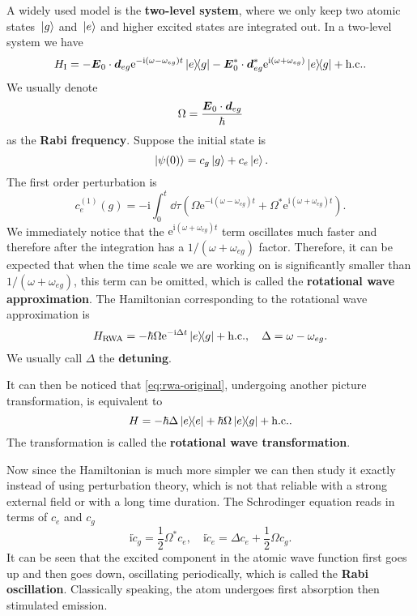 \documentclass[hyperref, a4paper]{article}
\newcommand*{\ii}{\mathrm{i}}
\newcommand*{\ee}{\mathrm{e}}
\newcommand*{\concept}[1]{{\textbf{#1}}}
\begin{document}
A widely used model is the \concept{two-level system}, where we only keep two atomic states $\ket*{g}$ and $\ket*{e}$ and higher excited states are integrated out.
In a two-level system we have 
\begin{equation}
    H_\text{I} = - \vb*{E}_0 \cdot \vb*{d}_{eg} \ee^{- \ii (\omega - \omega_{eg}) t} \dyad{e}{g} - \vb*{E}_0^* \cdot \vb*{d}^*_{{eg}} \ee^{\ii (\omega + \omega_{eg})} \dyad{e}{g} + \text{h.c.}.
\end{equation}
We usually denote 
\begin{equation}
    \Omega = \frac{\vb*{E}_0 \cdot \vb*{d}_{eg}}{\hbar}
\end{equation}
as the \concept{Rabi frequency}.
Suppose the initial state is 
\begin{equation}
    \ket*{\psi(0)} = c_{g} \ket*{g} + c_{e} \ket*{e}.
\end{equation}
The first order perturbation is 
\begin{equation}
    c^{(1)}_e(g) = - \ii \int_0^t \dd{\tau} (\Omega \ee^{- \ii (\omega - \omega_{eg}) t} + \Omega^* \ee^{\ii (\omega + \omega_{eg}) t}).
\end{equation}
We immediately notice that the $\ee^{\ii (\omega + \omega_{eg}) t}$ term oscillates much faster and therefore after the integration has a $1 / (\omega + \omega_{eg})$ factor.
Therefore, it can be expected that when the time scale we are working on is significantly smaller than $1 / (\omega + \omega_{eg})$, this term can be omitted, which is called the \concept{rotational wave approximation}.
The Hamiltonian corresponding to the rotational wave approximation is 
\begin{equation}
    H_\text{RWA} = - \hbar \Omega \ee^{- \ii \Delta t} \dyad{e}{g} + \text{h.c.}, \quad \Delta = \omega - \omega_{eg}.
    \label{eq:rwa-original}
\end{equation}
We usually call $\Delta$ the \concept{detuning}.

It can then be noticed that \eqref{eq:rwa-original}, undergoing another picture transformation, is equivalent to 
\begin{equation}
    H = - \hbar \Delta \dyad{e} + \hbar \Omega \dyad{e}{g} + \text{h.c.}.
\end{equation}
The transformation is called the \concept{rotational wave transformation}.

Now since the Hamiltonian is much more simpler we can then study it exactly instead of using perturbation theory, 
which is not that reliable with a strong external field or with a long time duration.
The Schrodinger equation reads in terms of $c_e$ and $c_g$
\begin{equation}
    \ii \dot{c}_g = \frac{1}{2} \Omega^* c_e, \quad \ii \dot{c}_e = \Delta c_e + \frac{1}{2} \Omega c_g.
\end{equation}
It can be seen that the excited component in the atomic wave function first goes up and then goes down, oscillating periodically,
which is called the \concept{Rabi oscillation}. 
Classically speaking, the atom undergoes first absorption then stimulated emission.
\end{document}
